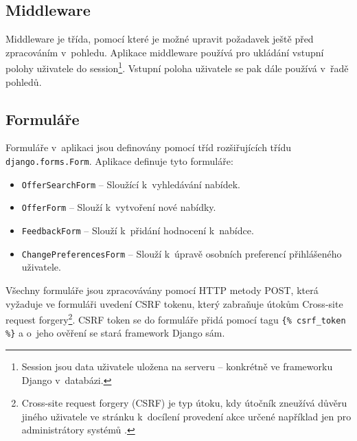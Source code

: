 \subsection{Middleware}
Middleware je třída, pomocí které je možné upravit požadavek ještě před zpracováním v~pohledu. Aplikace middleware používá pro ukládání vstupní polohy uživatele do session\footnote{Session jsou data uživatele uložena na serveru -- konkrétně ve frameworku Django v~databázi.}. Vstupní poloha uživatele se pak dále používá v~řadě pohledů.

\subsection{Formuláře}
\begin{sloppypar}
Formuláře v~aplikaci jsou definovány pomocí tříd rozšiřujících třídu \texttt{django.forms.Form}.
Aplikace definuje tyto formuláře:
\begin{itemize}
    \item \texttt{OfferSearchForm} -- Sloužící k~vyhledávání nabídek.
    \item \texttt{OfferForm} -- Slouží k~vytvoření nové nabídky.
    \item \texttt{FeedbackForm} -- Slouží k~přidání hodnocení k~nabídce.
    \item \texttt{ChangePreferencesForm} -- Slouží k~úpravě osobních preferencí přihlášeného uživatele.
\end{itemize}
Všechny formuláře jsou zpracovávány pomocí HTTP metody POST, která vyžaduje ve formuláři uvedení CSRF tokenu, který zabraňuje útokům Cross-site request forgery\footnote{Cross-site request forgery (CSRF) je typ útoku, kdy útočník zneužívá důvěru jiného uživatele ve stránku k~docílení provedení akce určené například jen pro administrátory systémů \cite{csrf}.}. CSRF token se do formuláře přidá pomocí tagu \mbox{\texttt{\{\% csrf\_token \%\}}} a o~jeho ověření se stará framework Django sám.
\end{sloppypar}